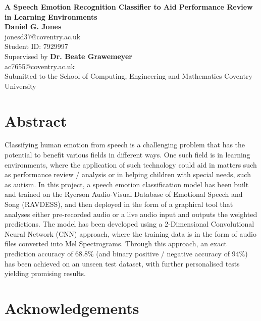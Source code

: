 \documentclass[12pt]{article}
\begin{document}

\begin{center}
	\vspace*{1cm}
	\Huge \textbf{A Speech Emotion Recognition Classifier to Aid Performance Review in Learning Environments} \\[1em]
	\vspace{5cm}
	\LARGE \textbf{Daniel G. Jones}
	\\
	\vspace{0.3cm}
	\large jonesd37@coventry.ac.uk
	\\
	\large Student ID: 7929997
	\\
	\vspace{3cm}
	\large Supervised by \textbf{Dr. Beate Grawemeyer}
	\\
	\vspace{0.3cm}
	\large ac7655@coventry.ac.uk
	\\
	\vspace{3cm}
	\large Submitted to the School of Computing, Engineering and Mathematics Coventry University
\end{center}
\newpage
\tableofcontents
\newpage
\section{Abstract}

Classifying human emotion from speech is a challenging problem that has the potential to benefit various fields in different ways. One such field is in learning environments, where the application of such technology could aid in matters such as performance review / analysis or in helping children with special needs, such as autism. In this project, a speech emotion classification model has been built and trained on the Ryerson Audio-Visual Database of Emotional Speech and Song (RAVDESS), and then deployed in the form of a graphical tool that analyses either pre-recorded audio or a live audio input and outputs the weighted predictions. The model has been developed using a 2-Dimensional Convolutional Neural Network (CNN) approach, where the training data is in the form of audio files converted into Mel Spectrograms. Through this approach, an exact prediction accuracy of 68.8\% (and binary positive / negative accuracy of 94\%) has been achieved on an unseen test dataset, with further personalised tests yielding promising results.

\section{Acknowledgements}
\end{document}
